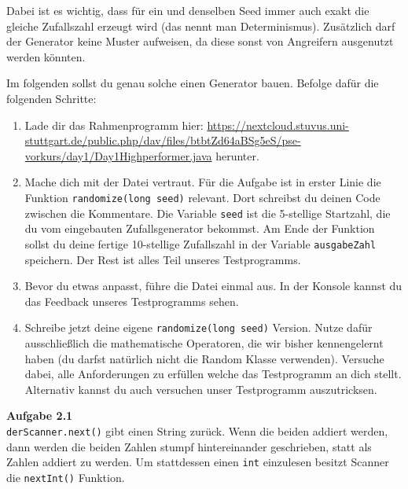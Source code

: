 \documentclass{../../sheet}
\begin{document}
Dabei ist es wichtig, dass für ein und denselben Seed immer auch exakt die gleiche Zufallszahl erzeugt wird (das nennt man Determinismus). 
Zusätzlich darf der Generator keine Muster aufweisen, da diese sonst von Angreifern ausgenutzt werden könnten.

Im folgenden sollst du genau solche einen Generator bauen. Befolge dafür die folgenden Schritte:
\begin{enumerate}
	\item Lade dir das Rahmenprogramm hier: \newline \url{https://nextcloud.stuvus.uni-stuttgart.de/public.php/dav/files/btbtZd64aBSg5eS/pse-vorkurs/day1/Day1Highperformer.java}  \newline  herunter.
  \item Mache dich mit der Datei vertraut. Für die Aufgabe ist in erster Linie die Funktion \texttt{randomize(long seed)} relevant. Dort schreibst du deinen Code zwischen die Kommentare. Die Variable \texttt{seed} ist die 5-stellige Startzahl, die du vom eingebauten Zufallsgenerator bekommst. Am Ende der Funktion sollst du deine fertige 10-stellige Zufallszahl in der Variable \texttt{ausgabeZahl} speichern. Der Rest ist alles Teil unseres Testprogramms.
  \item Bevor du etwas anpasst, führe die Datei einmal aus. In der Konsole kannst du das Feedback unseres Testprogramms sehen.
  \item Schreibe jetzt deine eigene \texttt{randomize(long seed)} Version. Nutze dafür ausschließlich die mathematische Operatoren, die wir bisher kennengelernt haben (du darfst natürlich nicht die Random Klasse verwenden).
  Versuche dabei, alle Anforderungen zu erfüllen welche das Testprogramm an dich stellt. Alternativ kannst du auch versuchen unser Testprogramm auszutricksen. 
\end{enumerate}

\newpage
{}
\hypertarget{Aufgabe_2.1}{}
\textbf{Aufgabe 2.1}\\
\texttt{derScanner.next()} gibt einen String zurück. Wenn die beiden addiert werden, dann werden die beiden Zahlen stumpf hintereinander geschrieben, statt als Zahlen addiert zu werden. Um stattdessen einen \texttt{int} einzulesen besitzt Scanner die \texttt{nextInt()} Funktion.
\end{document}
